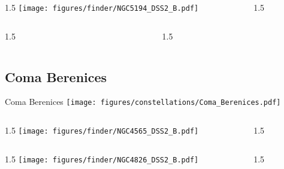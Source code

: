 \documentclass[final]{beamer}
\newlength{\colwidth}
\begin{document}

\begin{frame}[t]{}
\begin{columns}[T]
    \begin{column}{1.5\colwidth}
      \centering
      \texttt{[image: figures/finder/NGC5194\_DSS2\_B.pdf]}
    \end{column}
    \begin{column}{1.5\colwidth}
      \Large
      
    \end{column}
  \end{columns}
  \begin{columns}[T]
    \begin{column}{1.5\colwidth}
      \centering
    \end{column}
    \begin{column}{1.5\colwidth}
      \Large
      
    \end{column}
  \end{columns}
\end{frame}

\subsection{Coma Berenices}

\begin{frame}[t]{\LARGE Coma Berenices}
  \centering
  \texttt{[image: figures/constellations/Coma\_Berenices.pdf]}
\end{frame}


\begin{frame}[t]{}
  \begin{columns}[T]
    \begin{column}{1.5\colwidth}
      \centering
      \texttt{[image: figures/finder/NGC4565\_DSS2\_B.pdf]}
    \end{column}
    \begin{column}{1.5\colwidth}
      \Large
      
    \end{column}
  \end{columns}
  \vspace{\fill}
  \begin{columns}[T]
    \begin{column}{1.5\colwidth}
      \centering
      \texttt{[image: figures/finder/NGC4826\_DSS2\_B.pdf]}
    \end{column}
    \begin{column}{1.5\colwidth}
      \Large
      
    \end{column}
  \end{columns}
\end{frame}
\end{document}
